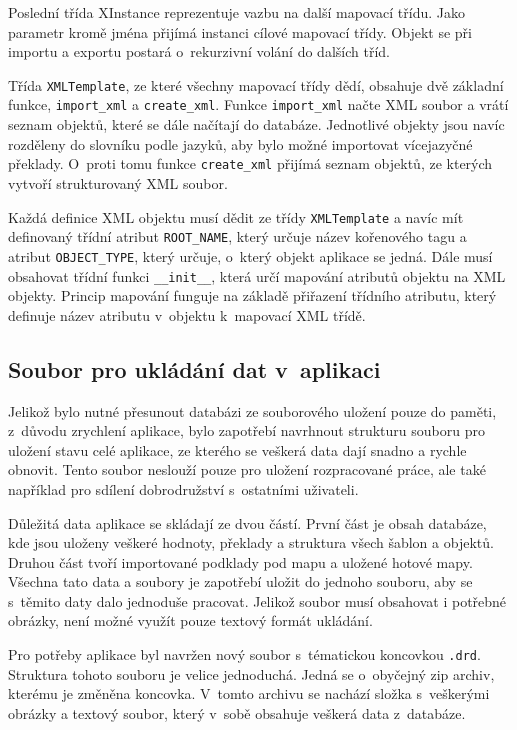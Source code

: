 \documentclass[thesis=B,czech]{resources/FITthesis}[2012/06/26]
\begin{document}
Poslední třída XInstance reprezentuje vazbu na další mapovací třídu. Jako parametr kromě jména přijímá instanci cílové mapovací třídy. Objekt se při importu a exportu postará o~rekurzivní volání do dalších tříd. \par

Třída \texttt{XMLTemplate}, ze které všechny mapovací třídy dědí, obsahuje dvě základní funkce, \texttt{import\_xml} a \texttt{create\_xml}. Funkce \texttt{import\_xml} načte XML soubor a vrátí seznam objektů, které se dále načítají do databáze. Jednotlivé objekty jsou navíc rozděleny do slovníku podle jazyků, aby bylo možné importovat vícejazyčné překlady. O~proti tomu funkce \texttt{create\_xml} přijímá seznam objektů, ze kterých vytvoří strukturovaný XML soubor. \par

Každá definice XML objektu musí dědit ze třídy \texttt{XMLTemplate} a navíc mít definovaný třídní atribut \texttt{ROOT\_NAME}, který určuje název kořenového tagu a atribut \texttt{OBJECT\_TYPE}, který určuje, o~který objekt aplikace se jedná. Dále musí obsahovat třídní funkci \texttt{\_\_init\_\_}, která určí mapování atributů objektu na XML objekty. Princip mapování funguje na základě přiřazení třídního atributu, který definuje název atributu v~objektu k~mapovací XML třídě. 

	\subsection{Soubor pro ukládání dat v~aplikaci}
Jelikož bylo nutné přesunout databázi ze souborového uložení pouze do paměti, z~důvodu zrychlení aplikace, bylo zapotřebí navrhnout strukturu souboru pro uložení stavu celé aplikace, ze kterého se veškerá data dají snadno a rychle obnovit. Tento soubor neslouží pouze pro uložení rozpracované práce, ale také například pro sdílení dobrodružství s~ostatními uživateli. \par

Důležitá data aplikace se skládají ze dvou částí. První část je obsah databáze, kde jsou uloženy veškeré hodnoty, překlady a struktura všech šablon a objektů. Druhou část tvoří importované podklady pod mapu a uložené hotové mapy. Všechna tato data a soubory je zapotřebí uložit do jednoho souboru, aby se s~těmito daty dalo jednoduše pracovat. Jelikož soubor musí obsahovat i potřebné obrázky, není možné využít pouze textový formát ukládání. \par

Pro potřeby aplikace byl navržen nový soubor s~tématickou koncovkou \texttt{.drd}. Struktura tohoto souboru je velice jednoduchá. Jedná se o~obyčejný zip archiv, kterému je změněna koncovka. V~tomto archivu se nachází složka s~veškerými obrázky a textový soubor, který v~sobě obsahuje veškerá data z~databáze. \par
\end{document}
